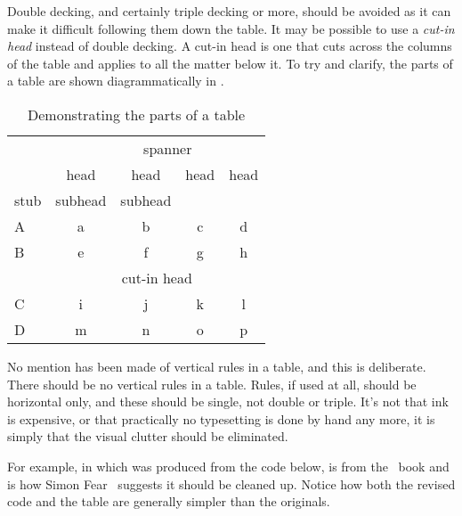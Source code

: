   Double decking, and certainly triple decking or more, should be avoided
as it can make it difficult following them down the table. It may be possible
to use a \emph{cut-in head} instead of 
double decking. A cut-in head is
one that cuts across the columns of the table and applies to all the 
matter below it. To try and clarify, the parts of a table
are shown diagrammatically in .

\begin{table}
\centering
\caption{Demonstrating the parts of a table} \label{tab:tabparts}
\begin{tabular}{lcccc} \toprule
     &    & \multicolumn{2}{c}{spanner} &  \\ \cmidrule{3-4}
     & head & head & head & head        \\
stub & subhead & subhead &       &      \\ \midrule
A    &   a     &   b     &   c   &   d  \\
B    &   e     &   f     &   g   &   h  \\ \cmidrule{2-5}
     & \multicolumn{4}{c}{cut-in head}  \\ \cmidrule{2-5}
C    &   i     &   j     &   k   &   l  \\
D    &   m     &   n     &   o   &   p  \\ \bottomrule
\end{tabular}
\end{table}

   No mention has been made of vertical 
rules in a table, and this is
deliberate. There should be no vertical rules in a table. Rules, 
if used at all, should be horizontal only, 
and these should be single, 
not double or triple. It's not that ink is expensive, or that practically
no typesetting is done by hand any more, it is simply that the visual 
clutter should be eliminated. 

    For example, in  which was produced from the code below,
 is from the \ltx\ book and 
 is how Simon Fear~\cite{BOOKTABS} suggests it
should be cleaned up. Notice how both the revised code and the table 
are generally simpler than the originals.

